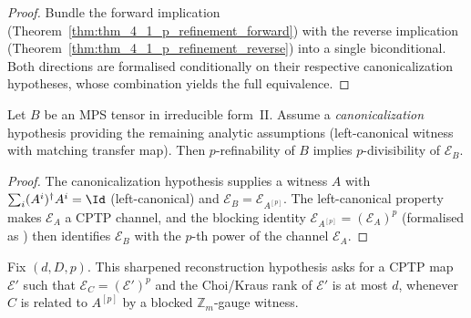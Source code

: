 \begin{proof}\leanok
    Bundle the forward implication
    (Theorem~\ref{thm:thm_4_1_p_refinement_forward}) with the reverse
    implication (Theorem~\ref{thm:thm_4_1_p_refinement_reverse}) into a
    single biconditional. Both directions are formalised conditionally on their
    respective canonicalization hypotheses, whose combination yields the full
    equivalence.
\end{proof}

\begin{theorem}%
    \label{thm:thm_4_1_p_refinement_forward}
    \leanok
    Let $B$ be an MPS tensor in irreducible form~II. Assume a
    \emph{canonicalization} hypothesis providing the remaining analytic
    assumptions (left-canonical witness with matching transfer map). Then
    $p$-refinability of $B$ implies $p$-divisibility of $\mathcal{E}_B$.
\end{theorem}

\begin{proof}\leanok
    The canonicalization hypothesis supplies a witness $A$ with
    $\sum_i (A^i)^\dagger A^i = \Id$ (left-canonical) and
    $\mathcal{E}_B = \mathcal{E}_{A^{[p]}}$. The left-canonical property makes
    $\mathcal{E}_A$ a CPTP channel, and the blocking identity
    $\mathcal{E}_{A^{[p]}} = (\mathcal{E}_A)^p$ (formalised as
    ) then identifies
    $\mathcal{E}_B$ with the $p$-th power of the channel $\mathcal{E}_A$.
\end{proof}

\begin{definition}
    \label{def:peripheral_equalcase_root_channel_from_zgauge}
    \leanok
    Fix $(d,D,p)$. This sharpened reconstruction hypothesis asks for a CPTP map
    $\mathcal E'$ such that
    $\mathcal E_C = (\mathcal E')^p$ and the Choi/Kraus rank of
    $\mathcal E'$ is at most $d$, whenever $C$ is related to $A^{[p]}$ by a
    blocked $\mathbb Z_m$-gauge witness.
\end{definition}

